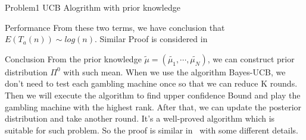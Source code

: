 \documentclass[letterpaper,12pt]{article}
\begin{document}
\begin{section}{Problem1 UCB Alogrithm with prior knowledge}
\begin{subsection}{Performance}
        	   From these two terms, we have conclusion that $E(T_a(n)) \sim log(n)$. Similar Proof is considered in \cite{Kaufmann2016On}
    \end{subsection}

    \begin{subsection}{Conclusion}
    	From the prior knowledge $\tilde{\mu} = (\tilde{\mu_{1}},\cdots, \tilde{\mu_N})$, we can construct prior distribution $\Pi^0$ with such mean. When we use the algorithm Bayes-UCB, we don't need to test each gambling machine once so that we can reduce K rounds. Then we will execute the algorithm to find upper confidence Bound and play the gambling machine with the highest rank. After that, we can update the posterior distribution and take another round. It's a well-proved algorithm which is suitable for such problem. So the proof is similar in~\cite{Kaufmann2016On} with some different details. 
    \end{subsection}
 \end{section}
\end{document}

